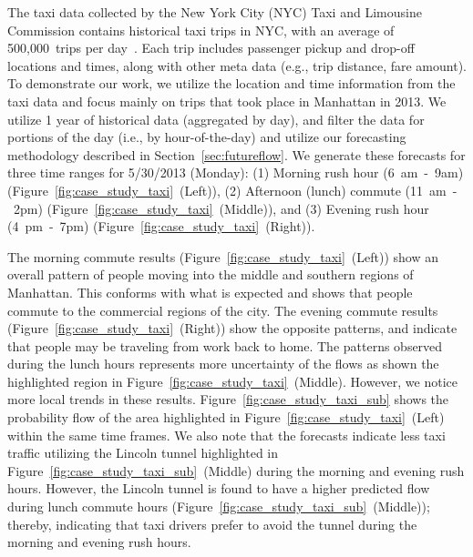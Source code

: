The taxi data collected by the New York City (NYC) Taxi and Limousine Commission contains historical taxi trips in NYC, with an average of 500,000~trips per day~\cite{NYC:2016:Taxi}.
Each trip includes passenger pickup and drop-off locations and times, along with other meta data (e.g., trip distance, fare amount).
To demonstrate our work, we utilize the location and time information from the taxi data and focus mainly on trips that took place in Manhattan in 2013.
We utilize 1 year of historical data (aggregated by day), and filter the data for portions of the day (i.e., by hour-of-the-day) and utilize our forecasting methodology described in Section~\ref{sec:futureflow}.
We generate these forecasts for three time ranges for 5/30/2013 (Monday): (1) Morning rush hour (6~am~-~9am) (Figure~\ref{fig:case_study_taxi}~(Left)), (2) Afternoon (lunch) commute (11~am~-~2pm) (Figure~\ref{fig:case_study_taxi}~(Middle)), and (3) Evening rush hour (4~pm~-~7pm) (Figure~\ref{fig:case_study_taxi}~(Right)).

The morning commute results (Figure~\ref{fig:case_study_taxi}~(Left)) show an overall pattern of people moving into the middle and southern regions of Manhattan.
This conforms with what is expected and shows that people commute to the commercial regions of the city.
The evening commute results (Figure~\ref{fig:case_study_taxi}~(Right)) show the opposite patterns, and indicate that people may be traveling from work back to home.
The patterns observed during the lunch hours represents more uncertainty of the flows as shown the highlighted region in Figure~\ref{fig:case_study_taxi}~(Middle).
However, we notice more local trends in these results.
Figure~\ref{fig:case_study_taxi_sub} shows the probability flow of the area highlighted in Figure~\ref{fig:case_study_taxi}~(Left) within the same time frames.
We also note that the forecasts indicate less taxi traffic utilizing the Lincoln tunnel highlighted in Figure~\ref{fig:case_study_taxi_sub}~(Middle) during the morning and evening rush hours. 
However, the Lincoln tunnel is found to have a higher predicted flow during lunch commute hours (Figure~\ref{fig:case_study_taxi_sub}~(Middle)); thereby, indicating that taxi drivers prefer to avoid the tunnel during the morning and evening rush hours.

